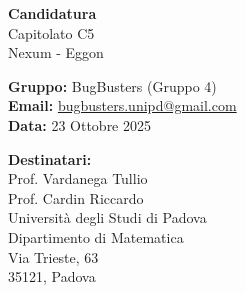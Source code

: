 \documentclass[a4paper,11pt]{article}
\newcommand{\fixeddate}{23 Ottobre 2025}
\begin{document}
\thispagestyle{empty}

\begin{tcolorbox}[
    colback=primarycolor!40,
    colframe=primarycolor!80,
    coltext=white,
    arc=3mm,
    boxrule=0pt,
    left=12pt,
    right=12pt,
    top=16pt,
    bottom=16pt
]
    \color{white}
    \begin{minipage}[c]{0.7\textwidth}
        {\Huge\bfseries Candidatura}\\[0.2cm]
        {\huge Capitolato C5}\\[0.3cm]
        {\Large Nexum - Eggon}
    \end{minipage}
    \hfill
    \begin{minipage}[c]{0.25\textwidth}
        \raggedleft
    \end{minipage}
\end{tcolorbox}

\vspace{1em}

\begin{tcolorbox}[
    colback=lightgray,
    colframe=lightgray,
    arc=3mm,
    boxrule=0pt,
    left=10pt,
    right=10pt,
    top=10pt,
    bottom=10pt
]
    \textbf{Gruppo:} BugBusters (Gruppo 4)\\
    \textbf{Email:} \href{mailto:bugbusters.unipd@gmail.com}{bugbusters.unipd@gmail.com}\\
    \textbf{Data:} \fixeddate %
\end{tcolorbox}

\vspace{2em}

\noindent
\textbf{Destinatari:}\\
Prof. Vardanega Tullio\\
Prof. Cardin Riccardo\\
Università degli Studi di Padova\\
Dipartimento di Matematica\\
Via Trieste, 63\\
35121, Padova
\end{document}
